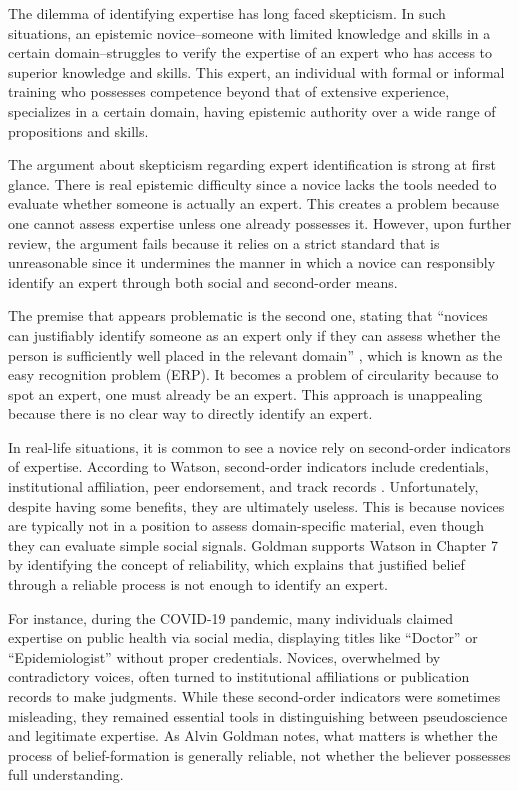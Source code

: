 \documentclass[12pt, a4paper, twoside]{article}
\begin{document}
\maketitle{}

The dilemma of identifying expertise has long faced skepticism. In such situations, an epistemic novice–someone with limited knowledge and skills in a certain domain–struggles to verify the expertise of an expert who has access to superior knowledge and skills. This expert, an individual with formal or informal training who possesses competence beyond that of extensive experience, specializes in a certain domain, having epistemic authority over a wide range of propositions and skills.

The argument about skepticism regarding expert identification is strong at first glance. There is real epistemic difficulty since a novice lacks the tools needed to evaluate whether someone is actually an expert. This creates a problem because one cannot assess expertise unless one already possesses it. However, upon further review, the argument fails because it relies on a strict standard that is unreasonable since it undermines the manner in which a novice can responsibly identify an expert through both social and second-order means.

The premise that appears problematic is the second one, stating that “novices can justifiably identify someone as an expert only if they can assess whether the person is sufficiently well placed in the relevant domain” \autocite[p.\ 178]{watson2022fixing}, which is known as the easy recognition problem (ERP). It becomes a problem of circularity because to spot an expert, one must already be an expert. This approach is unappealing because there is no clear way to directly identify an expert.

In real-life situations, it is common to see a novice rely on second-order indicators of expertise. According to Watson, second-order indicators include credentials, institutional affiliation, peer endorsement, and track records \autocite[p.\ 179]{watson2022fixing}. Unfortunately, despite having some benefits, they are ultimately useless. This is because novices are typically not in a position to assess domain-specific material, even though they can evaluate simple social signals. Goldman supports Watson in Chapter 7 by identifying the concept of reliability, which explains that justified belief through a reliable process is not enough to identify an expert.

For instance, during the COVID-19 pandemic, many individuals claimed expertise on public health via social media, displaying titles like “Doctor” or “Epidemiologist” without proper credentials. Novices, overwhelmed by contradictory voices, often turned to institutional affiliations or publication records to make judgments. While these second-order indicators were sometimes misleading, they remained essential tools in distinguishing between pseudoscience and legitimate expertise. As Alvin Goldman notes, what matters is whether the process of belief-formation is generally reliable, not whether the believer possesses full understanding.
\end{document}
